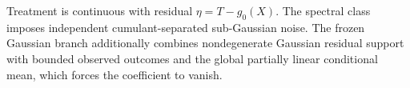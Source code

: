 Treatment is continuous with residual \(\eta=T-g_0(X)\).  The spectral class imposes independent cumulant-separated sub-Gaussian noise.  The frozen Gaussian branch additionally combines nondegenerate Gaussian residual support with bounded observed outcomes and the global partially linear conditional mean, which forces the coefficient to vanish.